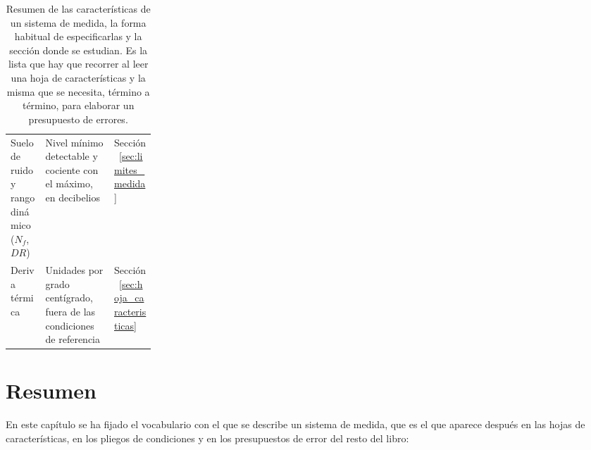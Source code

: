 \begin{table}[ht]
\begin{tabularx}{\linewidth}{@{} L{0.24\linewidth} >{\centering\arraybackslash}X >{\centering\arraybackslash}X @{}}
        Suelo de ruido y rango dinámico ($N_f$, $DR$) & Nivel mínimo detectable y cociente con el máximo, en decibelios & Sección~\ref{sec:limites_medida} \\
        Deriva térmica & Unidades por grado centígrado, fuera de las condiciones de referencia & Sección~\ref{sec:hoja_caracteristicas} \\
        \bottomrule
    \end{tabularx}
    \caption[Características de un sistema de medida y su forma de especificarlas.]{Resumen de las características de un sistema de medida, la forma habitual de especificarlas y la sección donde se estudian. Es la lista que hay que recorrer al leer una hoja de características y la misma que se necesita, término a término, para elaborar un presupuesto de errores.\protect\label{tab:caracteristicas_medida}}
\end{table}

\section{Resumen}\label{sec:resumen_caracteristicas}

En este capítulo se ha fijado el vocabulario con el que se describe un sistema de medida, que es el que aparece después en las hojas de características, en los pliegos de condiciones y en los presupuestos de error del resto del libro:

